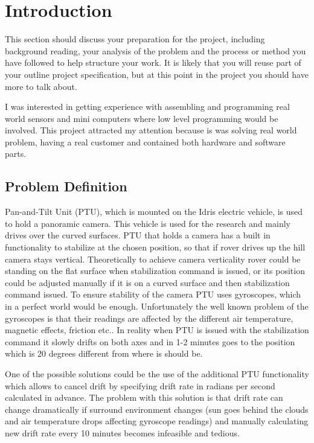 \chapter{Introduction}
This section should discuss your preparation for the project, including background reading, your analysis of the problem and the process or method you have followed to help structure your work.  It is likely that you will reuse part of your outline project specification, but at this point in the project you should have more to talk about. 

I was interested in getting experience with assembling and programming real world sensors and mini computers where low level programming would be involved. This project attracted my attention because is was solving real world problem, having a real customer and contained both hardware and software parts.

\section{Problem Definition}
Pan-and-Tilt Unit (PTU), which is mounted on the Idris electric vehicle, is used to hold a panoramic camera. This vehicle is used for the research and mainly drives over the curved surfaces. PTU that holds a camera has a built in functionality to stabilize at the chosen position, so that if rover drives up the hill camera stays vertical. Theoretically to achieve camera verticality rover could be standing on the flat surface when stabilization command is issued, or its position could be adjusted manually if it is on a curved surface and then stabilization command issued. To ensure stability of the camera PTU uses gyroscopes, which in a perfect world would be enough. Unfortunately the well known problem of the gyroscopes is that their readings are affected by the different air temperature, magnetic effects, friction etc.\cite{JacobFraden2010}. In reality when PTU is issued with the stabilization command it slowly drifts on both axes and in 1-2 minutes goes to the position which is 20 degrees different from where is should be. 

One of the possible solutions could be the use of the additional PTU functionality which allows to cancel drift by specifying drift rate in radians per second calculated in advance. The problem with this solution is that drift rate can change dramatically if surround environment changes (sun goes behind the clouds and air temperature drops affecting gyroscope readings) and manually calculating new drift rate every 10 minutes becomes infeasible and tedious. 

